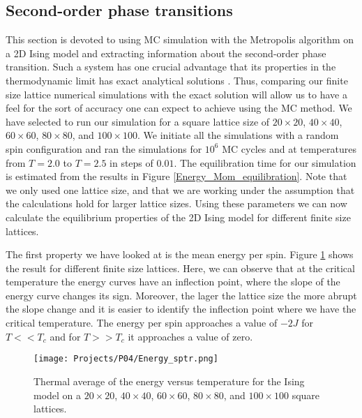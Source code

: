 \documentclass[a4paper]{article}
\begin{document}
\subsection{Second-order phase transitions}
This section is devoted to using MC simulation with the Metropolis algorithm on a 2D Ising model and extracting information about the second-order phase transition. Such a system has one crucial advantage that
its properties in the thermodynamic limit has exact analytical solutions \cite{PhysRev.65.117}. Thus, comparing our finite size lattice numerical simulations with the exact solution will allow us to have a feel for the sort of accuracy one can expect to achieve using the MC method. We have selected to run our simulation for a square lattice size of $20\times20$, $40\times40$,$60\times60$, $80\times80$, and $100\times100$. We initiate all the simulations with a random spin configuration and ran the simulations for $10^6$ MC cycles and at temperatures from $T = 2.0$ to $T = 2.5$ in steps of $0.01$. The equilibration time for our simulation is estimated from the results in Figure \ref{Energy_Mom_equilibration}. Note that we only used one lattice size, and that we are working under the assumption that the calculations hold for larger lattice sizes. Using these parameters we can now calculate the equilibrium properties of the 2D Ising model for different finite size lattices.

The first property we have looked at is the mean energy per spin. Figure \ref{Energy_sptr} shows the result for different finite size lattices. Here, we can observe that at the critical temperature the energy curves have an inflection point, where the slope of the energy curve changes its sign. Moreover, the lager the lattice size the more abrupt the slope change and it is easier to identify the inflection point where we have the critical temperature. The energy per spin approaches a value of $-2J$ for $T << T_c$ and for $T>>T_c$ it approaches a value of zero.

\begin{figure}[H]
  \centering
  \texttt{[image: Projects/P04/Energy\_sptr.png]}
  \caption{Thermal average of the energy versus temperature for the Ising model on a $20\times20$, $40\times40$, $60\times60$, $80\times80$, and $100\times100$ square lattices.}
   \label{Energy_sptr}
\end{figure}
\end{document}
